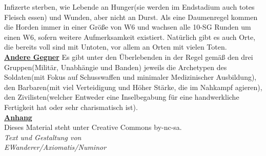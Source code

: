 \documentclass[twoside,a4paper]{minimal}
\begin{document}
\begin{multicols*}{3}
Infizerte sterben, wie Lebende an Hunger(sie werden im Endstadium auch totes Fleisch essen) und Wunden, aber nicht an Durst. Als eine Daumenregel kommen die Horden immer in einer Größe von W6 und wachsen alle 10-SG Runden um einen W6, sofern weitere Aufmerksamkeit existiert. Natürlich gibt es auch Orte, die bereits voll sind mit Untoten, vor allem an Orten mit vielen Toten.
\textbf{\uline{\\Andere Gegner}}
Es gibt unter den Überlebenden in der Regel gemäß den drei Gruppen(Militär, Unabhängie und Banden) jeweils die Archetypen des Soldaten(mit Fokus auf Schusswaffen und minimaler Medizinischer Ausbildung), den Barbaren(mit viel Verteidigung und Höher Stärke, die im Nahkampf agieren), den Zivilisten(welcher Entweder eine Inselbegabung für eine handwerkliche Fertigkeit hat oder sehr charismatisch ist).
\textbf{\uline{\\Anhang}}
\\Dieses Material steht unter Creative Commons by-nc-sa.
\textit{\\Text und Gestaltung von\\EWanderer/Axiomatis/Numinor}
\end{multicols*}
\end{document}
